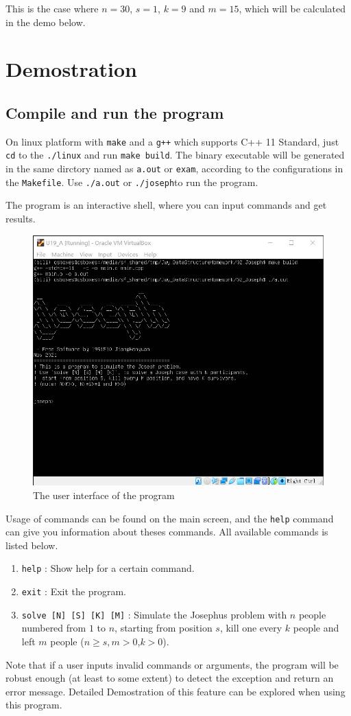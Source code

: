 \documentclass[cn,black,12pt,normal]{elegantnote}
\begin{document}
This is the case where $n=30$, $s=1$, $k=9$ and $m=15$, which will be calculated in the demo below.

\section{Demostration}

\subsection{Compile and run the program}

On linux platform with \lstinline{make} and a \lstinline{g++} which supports C++ 11 Standard, just \lstinline{cd} to the \lstinline{./linux} and run \lstinline{make build}. The binary executable will be generated in the same dirctory named as \lstinline{a.out} or \lstinline{exam}, according to the configurations in the \lstinline{Makefile}. Use \lstinline{./a.out} or \lstinline{./joseph}to run the program.

The program is an interactive shell, where you can input commands and get results.

\begin{figure}[H]
    \centering
    \includegraphics[width=0.7\linewidth]{image/j01.jpg}
    \caption{The user interface of the program}
\end{figure}

Usage of commands can be found on the main screen, and the \lstinline{help} command can give you information about theses commands.  All available commands is listed below.

\begin{enumerate}
    \item \lstinline{help} : Show help for a certain command.
    \item \lstinline{exit} : Exit the program.
    \item \lstinline{solve [N] [S] [K] [M]} : Simulate the Josephus problem with $n$ people numbered from $1$ to $n$, starting from position $s$, kill one every $k$ people and left $m$ people ($n\geq s,m >0$,$k>0$).
\end{enumerate}
Note that if a user inputs invalid commands or arguments, the program will be robust enough (at least to some extent) to detect the exception and return an error message. Detailed Demostration of this feature can be explored when using this program.
\end{document}

